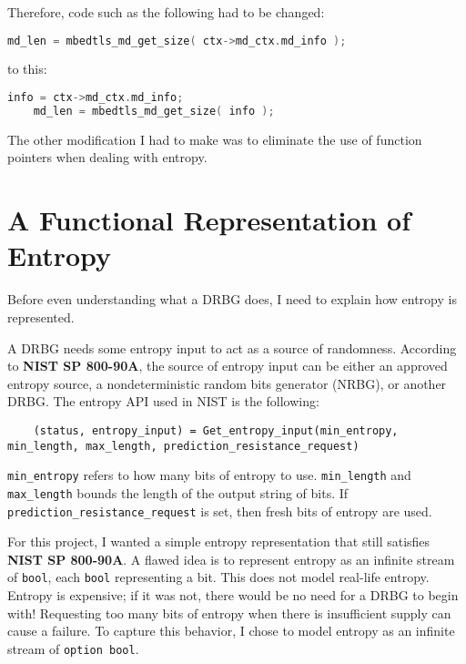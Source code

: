 \documentclass[pageno]{jpaper}
\newcommand{\stdtitle}[1]{\textbf{#1}}
\begin{document}
Therefore, code such as the following had to be changed:

\begin{lstlisting}[language=C]
    md_len = mbedtls_md_get_size( ctx->md_ctx.md_info );
\end{lstlisting}

to this:

\begin{lstlisting}[language=C]
    info = ctx->md_ctx.md_info;
    md_len = mbedtls_md_get_size( info );
\end{lstlisting}

The other modification I had to make was to eliminate the use of function pointers when dealing with entropy.

\section{A Functional Representation of Entropy} \label{entropy}
Before even understanding what a DRBG does, I need to explain how entropy is represented.

A DRBG needs some entropy input to act as a source of randomness. According to \stdtitle{NIST SP 800-90A}, the source of entropy input can be either an approved entropy source, a nondeterministic random bits generator (NRBG), or another DRBG. The entropy API used in NIST is the following:

\begin{lstlisting}
    (status, entropy_input) = Get_entropy_input(min_entropy, min_length, max_length, prediction_resistance_request)
\end{lstlisting}

\lstinline{min_entropy} refers to how many bits of entropy to use. \lstinline{min_length} and \lstinline{max_length} bounds the length of the output string of bits. If \lstinline{prediction_resistance_request} is set, then fresh bits of entropy are used.

For this project, I wanted a simple entropy representation that still satisfies \stdtitle{NIST SP 800-90A}. A flawed idea is to represent entropy as an infinite stream of \lstinline{bool}, each \lstinline{bool} representing a bit. This does not model real-life entropy. Entropy is expensive; if it was not, there would be no need for a DRBG to begin with! Requesting too many bits of entropy when there is insufficient supply can cause a failure. To capture this behavior, I chose to model entropy as an infinite stream of \lstinline{option bool}.
\end{document}
